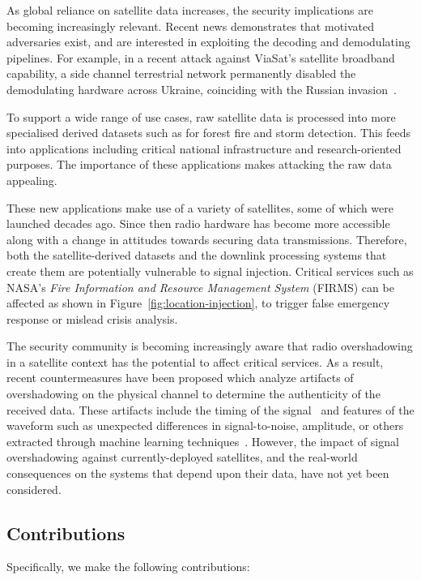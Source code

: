 As global reliance on satellite data increases, the security implications are becoming increasingly relevant.
Recent news demonstrates that motivated adversaries exist, and are interested in exploiting the decoding and demodulating pipelines.
For example, in a recent attack against ViaSat's satellite broadband capability, a side channel terrestrial network permanently disabled the demodulating hardware across Ukraine, coinciding with the Russian invasion~\cite{satcomAnalysis}.

To support a wide range of use cases, raw satellite data is processed into more specialised derived datasets such as for forest fire and storm detection.
This feeds into applications including critical national infrastructure and research-oriented purposes.
The importance of these applications makes attacking the raw data appealing.

These new applications make use of a variety of satellites, some of which were launched decades ago.
Since then radio hardware has become more accessible along with a change in attitudes towards securing data transmissions.
Therefore, both the satellite-derived datasets and the downlink processing systems that create them are potentially vulnerable to signal injection.
Critical services such as NASA's \textit{Fire Information and Resource Management System} (FIRMS) can be affected as shown in Figure~\ref{fig:location-injection}, to trigger false emergency response or mislead crisis analysis.

The security community is becoming increasingly aware that radio overshadowing in a satellite context has the potential to affect critical services.
As a result, recent countermeasures have been proposed which analyze artifacts of overshadowing on the physical channel to determine the authenticity of the received data.
These artifacts include the timing of the signal~\cite{jedermann2021orbit} and features of the waveform such as unexpected differences in signal-to-noise, amplitude, or others extracted through machine learning techniques~\cite{oligeri2020past}.
However, the impact of signal overshadowing against currently-deployed satellites, and the real-world consequences on the systems that depend upon their data, have not yet been considered.

\subsection{Contributions}

Specifically, we make the following contributions:

